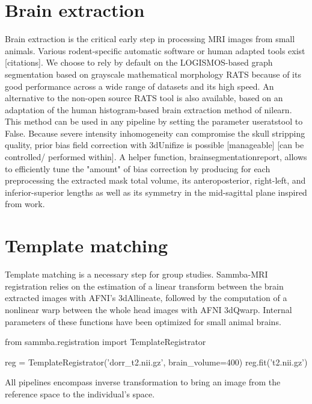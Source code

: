 \documentclass[utf8]{frontiersSCNS} %
\begin{document}
\section{Brain extraction}
Brain extraction is the critical early step in processing
MRI images from small animals. Various rodent-specific 
automatic software or human adapted tools exist [citations].
We choose to rely by default on 
the LOGISMOS-based graph segmentation based on grayscale mathematical morphology 
RATS \citep{oguz2014rats} because
of its good performance across a wide range of datasets and its high 
speed.
An alternative to the non-open source RATS tool  is also 
available, based on an adaptation of the 
human histogram-based brain extraction method of nilearn. 
This method can be used in any pipeline by setting the parameter
use\textunderscore rats\textunderscore  tool to False.
Because severe intensity inhomogeneity can compromise
the skull stripping quality, prior bias field correction with
3dUnifize
is possible [manageable] [can be controlled/ performed within].
A helper function, brainsegmentationreport, allows to
efficiently tune the "amount" of bias correction by
producing for each preprocessing the extracted mask total volume, its 
anteroposterior, right-left, and inferior-superior lengths as well
as its symmetry in the mid-sagittal plane 
inspired from \citet{powell2016fully} work.

\section{Template matching}
Template matching is a necessary step for group studies.
%
%
Sammba-MRI registration relies on the estimation of a linear transform
between the
brain extracted images
with AFNI's 3dAllineate, followed by the computation of a nonlinear
warp between the whole head images with AFNI 3dQwarp.
Internal parameters of these functions have been optimized for
small animal brains.
\begin{python}
from sammba.registration import TemplateRegistrator

reg = TemplateRegistrator('dorr_t2.nii.gz', brain_volume=400)
reg.fit('t2.nii.gz')
\end{python}
All pipelines encompass inverse transformation to bring an image from 
the reference space to the individual's space.
\end{document}
